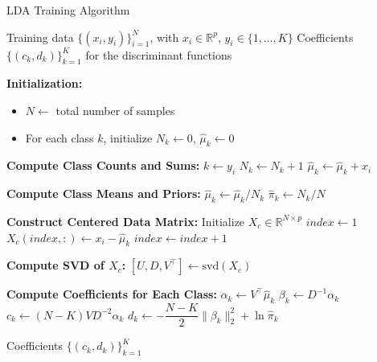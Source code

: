 \begin{algorithm}[htbp]
\caption{LDA Training Algorithm} \label{alg:lda-training}
\begin{algorithmic}[1]
\REQUIRE Training data $\{(x_i, y_i)\}_{i=1}^N$, with $x_i \in \mathbb{R}^p$, $y_i \in \{1,\ldots,K\}$
\ENSURE Coefficients $\{ (c_k, d_k) \}_{k=1}^K$ for the discriminant functions

\STATE \textbf{Initialization:}
\begin{itemize}
    \item $N \gets$ total number of samples
    \item For each class $k$, initialize $N_k \gets 0$, $\hat{\mu}_k \gets 0$
\end{itemize}

\STATE \textbf{Compute Class Counts and Sums:}
    \STATE $k \gets y_i$
    \STATE $N_k \gets N_k + 1$
    \STATE $\hat{\mu}_k \gets \hat{\mu}_k + x_i$
\ENDFOR

\STATE \textbf{Compute Class Means and Priors:}
    \STATE $\hat{\mu}_k \gets \hat{\mu}_k / N_k$
    \STATE $\hat{\pi}_k \gets N_k / N$
\ENDFOR

\STATE \textbf{Construct Centered Data Matrix:}
\STATE Initialize $X_c \in \mathbb{R}^{N \times p}$
\STATE $index \gets 1$
        \STATE $X_c(index, :) \gets x_i - \hat{\mu}_k$
        \STATE $index \gets index + 1$
    \ENDFOR
\ENDFOR

\STATE \textbf{Compute SVD of $X_c$:}
\STATE $[U, D, V^\top] \gets \text{svd}(X_c)$

\STATE \textbf{Compute Coefficients for Each Class:}
    \STATE $\alpha_k \gets V^\top \hat{\mu}_k$
    \STATE $\beta_k \gets D^{-1} \alpha_k$
    \STATE $c_k \gets (N - K) V D^{-2} \alpha_k$
    \STATE $d_k \gets -\dfrac{N - K}{2} \| \beta_k \|_2^2 + \ln \hat{\pi}_k$
\ENDFOR

\RETURN Coefficients $\{ (c_k, d_k) \}_{k=1}^K$
\end{algorithmic}
\end{algorithm}

